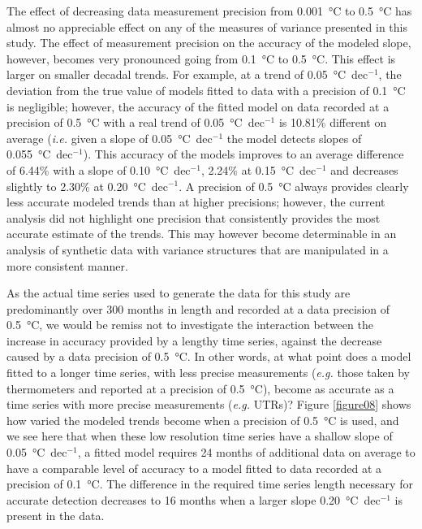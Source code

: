 \documentclass[twocol]{ametsoc}
\begin{document}
The effect of decreasing data measurement precision from \SI{0.001}{\degreeCelsius} to \SI{0.5}{\degreeCelsius} has almost no appreciable effect on any of the measures of variance presented in this study. The effect of measurement precision on the accuracy of the modeled slope, however, becomes very pronounced going from \SI{0.1}{\degreeCelsius} to \SI{0.5}{\degreeCelsius}. This effect is larger on smaller decadal trends. For example, at a trend of \SI{0.05}{\degreeCelsius}~dec$^{-1}$, the deviation from the true value of models fitted to data with a precision of \SI{0.1}{\degreeCelsius} is negligible; however, the accuracy of the fitted model on data recorded at a precision of \SI{0.5}{\degreeCelsius} with a real trend of \SI{0.05}{\degreeCelsius}~dec$^{-1}$ is 10.81\% different on average (\emph{i.e.} given a slope of \SI{0.05}{\degreeCelsius}~dec$^{-1}$ the model detects slopes of \SI{0.055}{\degreeCelsius}~dec$^{-1}$). This accuracy of the models improves to an average difference of 6.44\% with a slope of \SI{0.10}{\degreeCelsius}~dec$^{-1}$, 2.24\% at \SI{0.15}{\degreeCelsius}~dec$^{-1}$ and decreases slightly to 2.30\% at \SI{0.20}{\degreeCelsius}~dec$^{-1}$. A precision of \SI{0.5}{\degreeCelsius} always provides clearly less accurate modeled trends than at higher precisions; however, the current analysis did not highlight one precision that consistently provides the most accurate estimate of the trends. This may however become determinable in an analysis of synthetic data with variance structures that are manipulated in a more consistent manner.

As the actual time series used to generate the data for this study are predominantly over 300 months in length and recorded at a data precision of \SI{0.5}{\degreeCelsius}, we would be remiss not to investigate the interaction between the increase in accuracy provided by a lengthy time series, against the decrease caused by a data precision of \SI{0.5}{\degreeCelsius}. In other words, at what point does a model fitted to a longer time series, with less precise measurements (\emph{e.g.} those taken by thermometers and reported at a precision of \SI{0.5}{\degreeCelsius}), become as accurate as a time series with more precise measurements (\emph{e.g.} UTRs)? Figure \ref{figure08} shows how varied the modeled trends become when a precision of \SI{0.5}{\degreeCelsius} is used, and we see here that when these low resolution time series have a shallow slope of \SI{0.05}{\degreeCelsius}~dec$^{-1}$, a fitted model requires 24 months of additional data on average to have a comparable level of accuracy to a model fitted to data recorded at a precision of \SI{0.1}{\degreeCelsius}. The difference in the required time series length necessary for accurate detection decreases to 16 months when a larger slope \SI{0.20}{\degreeCelsius}~dec$^{-1}$ is present in the data.
\end{document}
